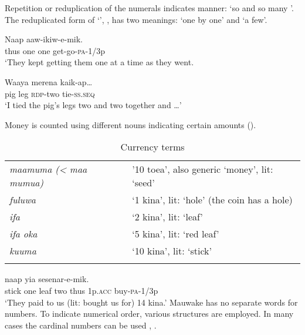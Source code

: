 Repetition  or reduplication  of the numerals indicates manner: `so and so many '. The reduplicated form of  `', , has two meanings: `one by one' and `a few'. 

\ea%
\label{ex:3:x93}
\gll Naap   aaw-ikiw-e-mik. \\
thus one one get-go-\textsc{pa}-1/3p\\
\glt`They kept getting them one at a time as they went.
\z

\ea%
\label{ex:3:x94}
\gll Waaya merena  kaik-ap{\dots} \\
pig leg \textsc{rdp}-two tie-\textsc{ss}.\textsc{seq}\\
\glt`I tied the pig's legs two and two together and {\dots}'
\z

Money is counted using different nouns indicating certain amounts ().

\begin{table}
\caption{Currency terms}
\label{tab:3:currency}
 
\begin{tabular}{>{\itshape}ll}
\mytoprule
maamuma ({\textless} maa mumua) &'10 toea', also generic `money', lit: `seed'\\
fuluwa &`1 kina', lit: `hole' (the coin has a hole)\\
ifa &`2 kina', lit: `leaf'\\
ifa oka &`5 kina', lit: `red leaf'\\
kuuma &`10 kina', lit: `stick'\\
\mybottomrule
\end{tabular}
\end{table}


\ea%
\label{ex:3:x97}
\gll {}    naap yia sesenar-e-mik. \\
stick\footnotemark{} one leaf two thus 1p.\textsc{acc} buy-\textsc{pa}-1/3p\\
\glt`They paid to us (lit: bought us for) 14 kina.' 
\z
{}
Mauwake has no separate words for  numbers. To indicate numerical order, various structures are employed. In many cases the cardinal numbers can be used , .

